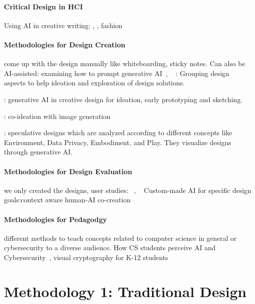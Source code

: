 \paragraph{Critical Design in HCI}

Using AI in creative writing: \cite{chakrabarty_art_2024}, \cite{kim_authors_2024}, fashion~\cite{davis_fashioning_2024}

\paragraph{Methodologies for Design Creation} come up with the design manually like whiteboarding, sticky notes. 
Can also be AI-assisted: examining how to prompt generative AI~\cite{sanchez_examining_2023}, ~\cite{chang_prompt_2023}
\cite{huang_designnet_2023}: Grouping design aspects to help ideation and exploration of design solutions.

\cite{tholander_design_2023}: generative AI in creative design for ideation, early prototyping and sketching.

\cite{chiou_designing_2023}: co-ideation with image generation

\cite{lin_generative_2023}: speculative designs which are analyzed according to different concepts like  Environment, Data Privacy, Embodiment, and Play. They visualize designs through generative AI.


\paragraph{Methodologies for Design Evaluation} we only created the designs, 
user studies: ~\cite{sanchez_examining_2023}, ~\cite{chang_prompt_2023}
Custom-made AI for specific design goals:context aware human-AI co-creation\cite{fan_contextcam_2024}

\paragraph{Methodologies for Pedagodgy} different methods to teach concepts related to computer science in general or cybersecurity to a diverse audience. How CS students perceive AI and Cybersecurity~\cite{ojha_computing_2023}, visual cryptography for K-12 students~\cite{rayavaram_designing_2023}





\section{Methodology 1: Traditional Design}

